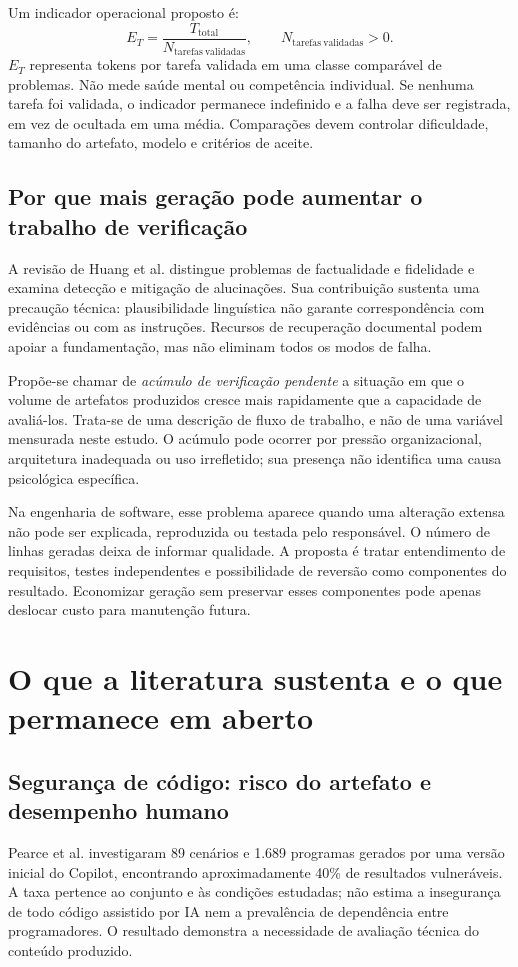 \documentclass[11pt,a4paper]{article}
\begin{document}
Um indicador operacional proposto é:
\begin{equation}
E_T=\frac{T_{\mathrm{total}}}{N_{\mathrm{tarefas\ validadas}}},
\qquad N_{\mathrm{tarefas\ validadas}}>0.
\end{equation}
$E_T$ representa tokens por tarefa validada em uma classe comparável de problemas. Não mede saúde mental ou competência individual. Se nenhuma tarefa foi validada, o indicador permanece indefinido e a falha deve ser registrada, em vez de ocultada em uma média. Comparações devem controlar dificuldade, tamanho do artefato, modelo e critérios de aceite.

\subsection{Por que mais geração pode aumentar o trabalho de verificação}
A revisão de Huang et al. \cite{huang} distingue problemas de factualidade e fidelidade e examina detecção e mitigação de alucinações. Sua contribuição sustenta uma precaução técnica: plausibilidade linguística não garante correspondência com evidências ou com as instruções. Recursos de recuperação documental podem apoiar a fundamentação, mas não eliminam todos os modos de falha.

Propõe-se chamar de \textit{acúmulo de verificação pendente} a situação em que o volume de artefatos produzidos cresce mais rapidamente que a capacidade de avaliá-los. Trata-se de uma descrição de fluxo de trabalho, e não de uma variável mensurada neste estudo. O acúmulo pode ocorrer por pressão organizacional, arquitetura inadequada ou uso irrefletido; sua presença não identifica uma causa psicológica específica.

Na engenharia de software, esse problema aparece quando uma alteração extensa não pode ser explicada, reproduzida ou testada pelo responsável. O número de linhas geradas deixa de informar qualidade. A proposta é tratar entendimento de requisitos, testes independentes e possibilidade de reversão como componentes do resultado. Economizar geração sem preservar esses componentes pode apenas deslocar custo para manutenção futura.

\section{O que a literatura sustenta e o que permanece em aberto}
\subsection{Segurança de código: risco do artefato e desempenho humano}
Pearce et al. \cite{pearce} investigaram 89 cenários e 1.689 programas gerados por uma versão inicial do Copilot, encontrando aproximadamente 40\% de resultados vulneráveis. A taxa pertence ao conjunto e às condições estudadas; não estima a insegurança de todo código assistido por IA nem a prevalência de dependência entre programadores. O resultado demonstra a necessidade de avaliação técnica do conteúdo produzido.
\end{document}
